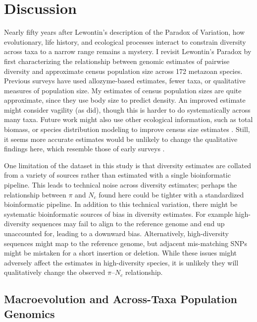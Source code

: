 \documentclass[9pt,lineno]{elife}
\begin{document}
\section{Discussion}

Nearly fifty years after Lewontin's description of the Paradox of Variation,
how evolutionary, life history, and ecological processes interact to constrain
diversity across taxa to a narrow range remains a mystery. I revisit Lewontin's
Paradox by first characterizing the relationship between genomic estimates of
pairwise diversity and approximate census population size across 172 metazoan
species. Previous surveys have used allozyme-based estimates, fewer taxa, or
qualitative measures of population size. My estimates of census population
sizes are quite approximate, since they use body size to predict density. An
improved estimate might consider vagility (as \cite{Soule1976-he} did), though
this is harder to do systematically across many taxa. Future work might also
use other ecological information, such as total biomass, or species
distribution modeling to improve census size estimates
\citep{Bar-On2018-kc,Mora2011-wm}.  Still, it seems more accurate
estimates would be unlikely to change the qualitative findings here, which
resemble those of early surveys \citep{Nei1984-zi,Soule1976-he}.

One limitation of the dataset in this study is that diversity estimates are
collated from a variety of sources rather than estimated with a single
bioinformatic pipeline. This leads to technical noise across diversity
estimates; perhaps the relationship between $\pi$ and $N_c$ found here could be
tighter with a standardized bioinformatic pipeline. In addition to this
technical variation, there might be systematic bioinformatic sources of bias in
diversity estimates. For example high-diversity sequences may fail to align to
the reference genome and end up unaccounted for, leading to a downward bias.
Alternatively, high-diversity sequences might map to the reference genome, but
adjacent mis-matching SNPs might be mistaken for a short insertion or deletion.
While these issues might adversely affect the estimates in high-diversity
species, it is unlikely they will qualitatively change the observed
$\pi$--$N_c$ relationship.

\subsection{Macroevolution and Across-Taxa Population Genomics}
\end{document}
